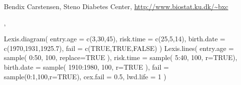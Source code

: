 \begin{Author}\relax
Bendix Carstensen, Steno Diabetes Center,
\url{http://www.biostat.ku.dk/~bxc}
\end{Author}
\begin{SeeAlso}\relax
{},
\end{SeeAlso}
\begin{Examples}
\begin{ExampleCode}
Lexis.diagram( entry.age = c(3,30,45),
               risk.time = c(25,5,14),
              birth.date = c(1970,1931,1925.7),
                    fail = c(TRUE,TRUE,FALSE) )
Lexis.lines( entry.age = sample( 0:50, 100, replace=TRUE ),
             risk.time = sample( 5:40, 100, r=TRUE),
            birth.date = sample( 1910:1980, 100, r=TRUE ),
                  fail = sample(0:1,100,r=TRUE),
              cex.fail = 0.5,
              lwd.life = 1 )
\end{ExampleCode}
\end{Examples}

